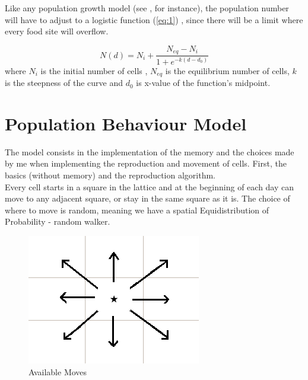 \documentclass[a4paper,prd,twocolumn,nofootinbib,superscriptaddress,floatfix]{revtex4}
\begin{document}
Like any population growth model (see \cite{logistic}, for instance), the population number will have to adjust to a logistic function (\ref{eq:1}) , since there will be a limit where every food site will overflow.

\begin{equation}
N(d)=N_i + \frac{N_{eq}-N_i}{1+e^{-k(d-d_0)}}
\label{eq:1}
\end{equation}
where  $N_i$ is the initial number of cells , $N_{eq}$ is the equilibrium number of cells, $k$ is the steepness of the curve and $d_0$ is x-value of the function's midpoint.\\


\section{Population Behaviour Model}
The model consists in the implementation of the memory and the choices made by me when implementing the reproduction and movement of cells. First, the basics (without memory) and the reproduction algorithm.\\

Every cell starts in a square in the lattice and at the beginning of each day can move to any adjacent square, or stay in the same square as it is. The choice of where to move is random, meaning we have a spatial Equidistribution of Probability - random walker.\\
\begin{figure}[H]
\centering
  \includegraphics[scale=0.3]{move.png}
\caption{Available Moves}
  \label{fig:2}
\end{figure}
\end{document}
